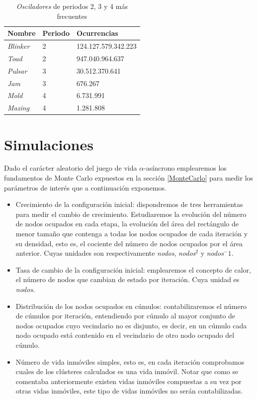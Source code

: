 \documentclass[../proyecto.tex]{memoir}
\begin{document}
\begin{table}
\centering
\begin{tabular}{|l|l|l|}
\hline
\textbf{Nombre}  & \textbf{Periodo} & \textbf{Ocurrencias} \\ \hline
\textit{Blinker} & 2                & 124.127.579.342.223  \\ \hline
\textit{Toad}    & 2                & 947.040.964.637      \\ \hline
\textit{Pulsar}  & 3                & 30.512.370.641       \\ \hline
\textit{Jam}     & 3                & 676.267              \\ \hline
\textit{Mold}    & 4                & 6.731.991            \\ \hline
\textit{Mazing}  & 4                & 1.281.808            \\ \hline
\end{tabular}
\caption{\textit{Osciladores} de periodos 2, 3 y 4 más frecuentes}
\label{tab:osciladores}
\end{table}

\section{Simulaciones} \label{vars}

Dado el carácter aleatorio del juego de vida $\alpha$-asíncrono emplearemos los fundamentos de Monte Carlo expuestos en la sección \ref{MonteCarlo} para medir los parámetros de interés que a continuación exponemos.

\begin{itemize}
\item Crecimiento de la configuración inicial: dispondremos de tres herramientas para medir el cambio de crecimiento. Estudiaremos la evolución del número de nodos ocupados en cada etapa, la evolución del área del rectángulo de menor tamaño que contenga a todas los nodos ocupados de cada iteración y su densidad, esto es, el cociente del número de nodos ocupados por el área anterior. Cuyas unidades son respectivamente \textit{nodos}, \textit{nodos}$^2$ y \textit{nodos}$^-1$.
\item Tasa de cambio de la configuración inicial: emplearemos el concepto de calor, el número de nodos que cambian de estado por iteración. Cuya unidad es \textit{nodos}.
\item Distribución de los nodos ocupados en cúmulos: contabilizaremos el número de cúmulos por iteración, entendiendo por cúmulo al mayor conjunto de nodos ocupados cuyo vecindario no es disjunto, es decir, en un cúmulo cada nodo ocupado está contenido en el vecindario de otro nodo ocupado del cúmulo.
\item Número de vida inmóviles simples, esto es, en cada iteración comprobamos cuales de los clústeres calculados es una vida inmóvil. Notar que como se comentaba anteriormente existen vidas inmóviles compuestas a su vez por otras vidas inmóviles, este tipo de vidas inmóviles no serán contabilizadas.
\end{itemize}
\end{document}
